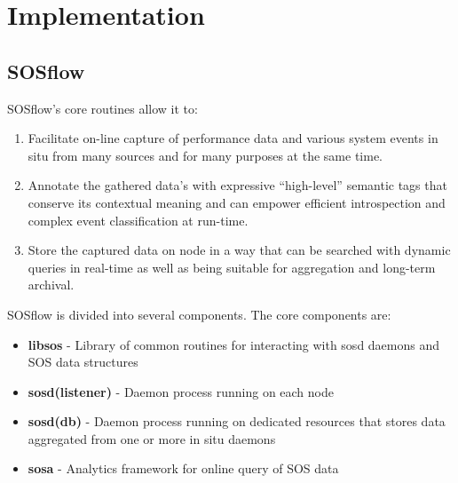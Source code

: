 %




\section{Implementation}


\subsection{SOSflow}
SOSflow's core routines allow it to:
%
\begin{enumerate}
    \item Facilitate on-line capture of performance data and various system
      events in situ from many sources and
      for many purposes at the same time.
    \item Annotate the gathered data's with
      expressive ``high-level'' semantic tags that conserve its contextual
      meaning
      and can empower efficient introspection and complex event classification
      at run-time.
    \item Store the captured data on node in a way that can be
      searched with dynamic queries in real-time as well as being
      suitable for aggregation and long-term archival.
\end{enumerate}

SOSflow is divided into several components.  The core components are:
%
\begin{itemize}
    \item \textbf{libsos} - Library of common routines for interacting with
      sosd daemons and SOS data structures
    \item \textbf{sosd(listener)} - Daemon process running on each node
    \item \textbf{sosd(db)} - Daemon process running on dedicated resources
      that stores data aggregated from one or more in situ daemons
    \item \textbf{sosa} - Analytics framework for online query of SOS data
\end{itemize}

